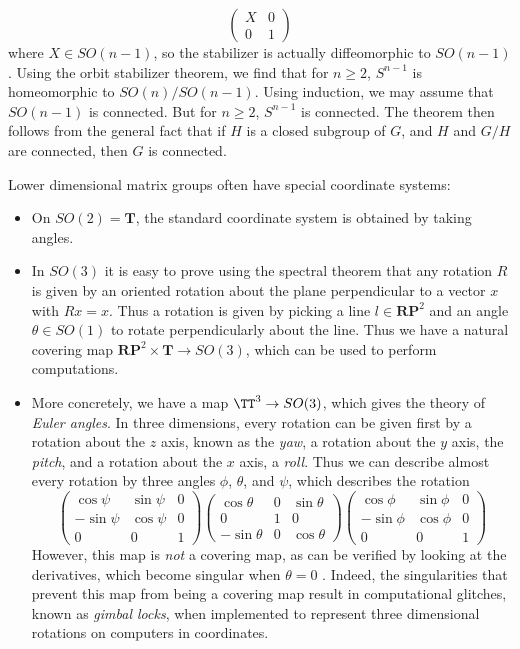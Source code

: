 \begin{example}
    \[ \begin{pmatrix} X & 0 \\ 0 & 1 \end{pmatrix} \]
    where $X \in SO(n-1)$, so the stabilizer is actually diffeomorphic to $SO(n-1)$. Using the orbit stabilizer theorem, we find that for $n \geq 2$, $S^{n-1}$ is homeomorphic to $SO(n)/SO(n-1)$. Using induction, we may assume that $SO(n-1)$ is connected. But for $n \geq 2$, $S^{n-1}$ is connected. The theorem then follows from the general fact that if $H$ is a closed subgroup of $G$, and $H$ and $G/H$ are connected, then $G$ is connected.
\end{example}

Lower dimensional matrix groups often have special coordinate systems:
%
\begin{itemize}
        \item On $SO(2) = \mathbf{T}$, the standard coordinate system is obtained by taking angles.

        \item In $SO(3)$ it is easy to prove using the spectral theorem that any rotation $R$ is given by an oriented rotation about the plane perpendicular to a vector $x$ with $Rx = x$. Thus a rotation is given by picking a line $l \in \mathbf{RP}^2$ and an angle $\theta \in SO(1)$ to rotate perpendicularly about the line. Thus we have a natural covering map $\mathbf{RP}^2 \times \mathbf{T} \to SO(3)$, which can be used to perform computations.

        \item More concretely, we have a map $\TT^3 \to SO(3)$, which gives the theory of \emph{Euler angles}. In three dimensions, every rotation can be given first by a rotation about the $z$ axis, known as the \emph{yaw}, a rotation about the $y$ axis, the \emph{pitch}, and a rotation about the $x$ axis, a \emph{roll}. Thus we can describe almost every rotation by three angles $\phi$, $\theta$, and $\psi$, which describes the rotation
        \[ \begin{pmatrix} \cos \psi & \sin \psi & 0 \\ - \sin \psi & \cos \psi & 0 \\ 0 & 0 & 1 \end{pmatrix} \begin{pmatrix} \cos \theta & 0 & \sin \theta \\ 0 & 1 & 0 \\ -\sin \theta & 0 & \cos \theta \end{pmatrix} \begin{pmatrix} \cos \phi & \sin \phi & 0 \\ -\sin \phi & \cos \phi & 0 \\ 0 & 0 & 1 \end{pmatrix} \]
        However, this map is \emph{not} a covering map, as can be verified by looking at the derivatives, which become singular when $\theta = 0$ . Indeed, the singularities that prevent this map from being a covering map result in computational glitches, known as \emph{gimbal locks}, when implemented to represent three dimensional rotations on computers in coordinates.
\end{itemize}
